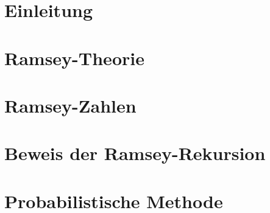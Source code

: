 \documentclass{article}
\begin{document}
\tableofcontents

\section{Einleitung}

\section{Ramsey-Theorie}

\section{Ramsey-Zahlen}

\section{Beweis der Ramsey-Rekursion}

\section{Probabilistische Methode}
\end{document}
